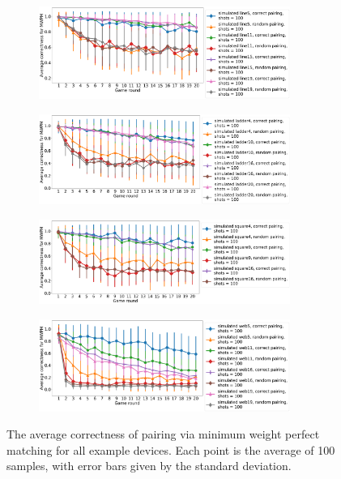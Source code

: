 \documentclass[aps,prl,twocolumn,showpacs,preprintnumbers]{revtex4-1}
\begin{document}
\begin{figure}
    \centering
    \begin{subfigure}[b]{\textwidth}
        \includegraphics[width=0.9\textwidth]{figures/line_mwpm.png}
    \end{subfigure}
    \begin{subfigure}[b]{\textwidth}
        \includegraphics[width=0.9\textwidth]{figures/ladder_mwpm.png}
    \end{subfigure}
    \begin{subfigure}[b]{\textwidth}
        \includegraphics[width=0.9\textwidth]{figures/square_mwpm.png}
    \end{subfigure}
    \begin{subfigure}[b]{\textwidth}
        \includegraphics[width=0.9\textwidth]{figures/web_mwpm.png}
    \end{subfigure}
    \caption{The average correctness of pairing via minimum weight perfect matching for all example devices. Each point is the average of 100 samples, with error bars given by the standard deviation.}\label{fig:example_mwpm}
\end{figure}
\end{document}
